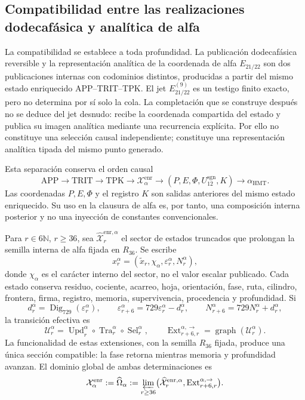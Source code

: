 \subsection{Compatibilidad entre las realizaciones dodecafásica y analítica de alfa}
\label{ix:subsec:alpha-limite-dos-vias}

La compatibilidad se establece a toda profundidad. La publicación
dodecafásica reversible y la representación analítica de la
coordenada de alfa
\(E_{21/22}\) son dos publicaciones internas con codominios distintos,
producidas a partir del mismo estado enriquecido APP--TRIT--TPK. El jet
\(E_{21/22}^{(9)}\) es un testigo finito exacto, pero no determina por sí solo
la cola. La completación que se construye después no se deduce del jet
desnudo: recibe la coordenada compartida del estado y publica su imagen
analítica mediante una recurrencia explícita. Por ello no constituye una
selección causal independiente; constituye una representación analítica
tipada del mismo punto generado.

Esta separación conserva el orden causal
\[
 \mathrm{APP}\longrightarrow\mathrm{TRIT}\longrightarrow\mathrm{TPK}
 \longrightarrow\mathcal X_{\alpha}^{\mathrm{enr}}
 \longrightarrow (P,E,\Phi,U_{12}^{\mathrm{sgn}},K)
 \longrightarrow\alpha_{\mathrm{HMT}}.
\]
Las coordenadas \(P,E,\Phi\) y el registro \(K\) son salidas anteriores del
mismo estado enriquecido. Su uso en la clausura de alfa es, por tanto, una
composición interna posterior y no una inyección de constantes
convencionales.

Para \(r\in6\mathbb N\), \(r\ge36\), sea
\(\widehat{\mathcal X}^{\mathrm{enr},\alpha}_r\) el sector de estados
truncados que prolongan la semilla interna de alfa fijada en \(R_{36}\). Se
escribe
\[
 x_r^\alpha=(\widetilde x_r,\chi_\alpha,
              \varepsilon_r^\alpha,N_r^\alpha),
\]
donde \(\chi_\alpha\) es el carácter interno del sector, no el valor escalar
publicado. Cada estado conserva residuo, cociente, acarreo, hoja, orientación,
fase, ruta, cilindro, frontera, firma, registro, memoria, supervivencia,
procedencia y profundidad. Si
\[
 d_r^\alpha=\operatorname{Dig}_{729}(\varepsilon_r^\alpha),\qquad
 \varepsilon_{r+6}^\alpha=729\varepsilon_r^\alpha-d_r^\alpha,
 \qquad N_{r+6}^\alpha=729N_r^\alpha+d_r^\alpha,
\]
la transición efectiva es
\[
 \mathcal U_r^\alpha=
 \operatorname{Upd}_r^\alpha\circ
 \operatorname{Tra}_r^\alpha\circ
 \operatorname{Sel}_r^\alpha,
 \qquad
 \operatorname{Ext}^{\alpha,\to}_{r+6,r}
 =\operatorname{graph}(\mathcal U_r^\alpha).
\]
La funcionalidad de estas extensiones, con la semilla \(R_{36}\) fijada,
produce una única sección compatible: la fase retorna mientras memoria y
profundidad avanzan. El dominio global de ambas determinaciones es
\begin{equation}
 \mathcal X_\alpha^{\mathrm{enr}}:=\widehat\Omega_\alpha
 :=\varprojlim_{r\ge36}
 \bigl(\widehat{\mathcal X}^{\mathrm{enr},\alpha}_r,
       \operatorname{Ext}^{\alpha,\to}_{r+6,r}\bigr).
 \label{ix:eq:alpha-dominio-enriquecido-completo}
\end{equation}

